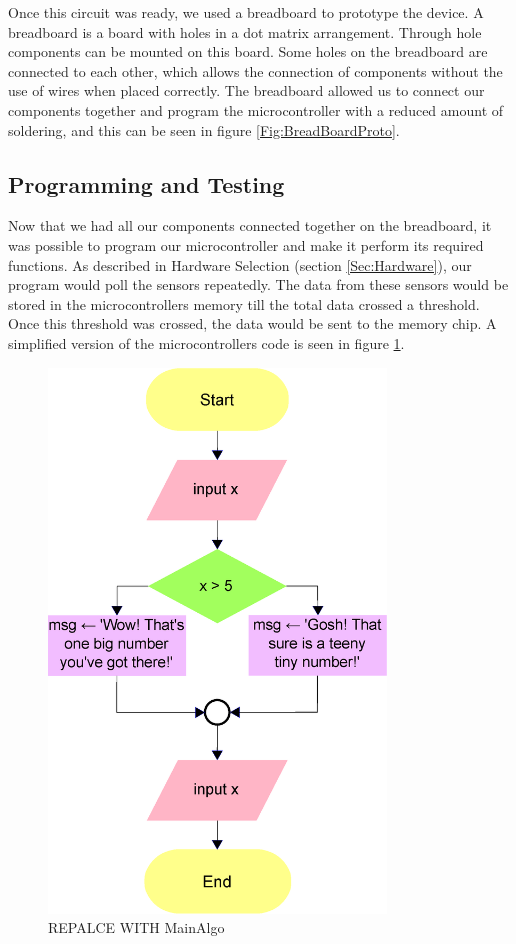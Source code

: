 Once this circuit was ready, we used a breadboard to prototype the device.
A breadboard is a board with holes in a dot matrix arrangement.
Through hole components can be mounted on this board.
Some holes on the breadboard are connected to each other,
which allows the connection of components without the use of wires when placed correctly.
The breadboard allowed us to connect our components together and program the microcontroller with a reduced amount of soldering, 
and this can be seen in figure \ref{Fig:BreadBoardProto}.

\subsection{Programming and Testing}
\label{Sec:Programming}
Now that we had all our components connected together on the breadboard,
it was possible to program our microcontroller and make it perform its required functions.
As described in Hardware Selection (section \ref{Sec:Hardware}),
our program would poll the sensors repeatedly.
The data from these sensors would be stored in the microcontrollers memory till the total data crossed a threshold.
Once this threshold was crossed, the data would be sent to the memory chip.
A simplified version of the microcontrollers code is seen in figure \ref{Fig:MainAlgo}.
\begin{figure}
\begin{center}
\includegraphics[width=0.8\textwidth]{images/MainAlgo.eps}
\caption{REPALCE WITH MainAlgo}
\label{Fig:MainAlgo}
\end{center}
\end{figure}
